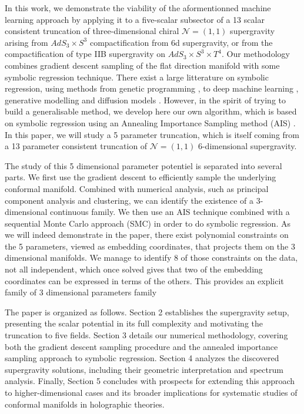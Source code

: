 \documentclass[11pt]{article}
\begin{document}
In this work, we demonstrate the viability of the aformentionned machine learning approach by applying it to a five-scalar subsector of a 13 scalar consistent truncation of three-dimensional chiral $\mathcal{N} = (1,1)$  supergravity arising from $AdS_3 \times S^3$ compactification from 6d supergravity, or from the compactification of type IIB supergravity on $AdS_3 \times S^3 \times T^4$. Our methodology combines gradient descent sampling of the flat direction manifold with some symbolic regression technique. There exist a large litterature on symbolic regression, using methods from genetic programming \cite{koza1994genetic,randall2022bingo,burlacu2019parsimony}, to deep machine learning \cite{petersen2019deep,kamienny2022end}, generative modelling \cite{valipour2021symbolicgpt} and diffusion models \cite{bastiani2025diffusion}. However, in the spirit of trying to build a generalisable method, we develop here our own algorithm, which is based on symbolic regression using an Annealing Importance Sampling method (AIS) \cite{neal1998annealedimportancesampling}. In this paper, we will study a 5 parameter truncation, which is itself coming from a 13 parameter consistent truncation of $\mathcal{N} = (1,1)$ 6-dimensional supergravity. 

The study of this 5 dimensional parameter potentiel is separated into several parts. We first use the gradient descent to efficiently sample the underlying conformal manifold. Combined with numerical analysis, such as principal component analysis and clustering, we can identify the existence of a 3-dimensional continuous family. We then use an AIS technique combined with a sequential Monte Carlo approach (SMC) \cite{del2006sequential} in order to do symbolic regression. As we will indeed demonstrate in the paper, there exist polynomial constraints on the 5 parameters, viewed as embedding coordinates, that projects them on the 3 dimensional manifolds. We manage to identify 8 of those constraints on the data, not all independent, which once solved gives that two of the embedding coordinates can be expressed in terms of the others. This provides an explicit family of 3 dimensional parameters family 

The paper is organized as follows. Section 2 establishes the supergravity setup, presenting the scalar potential in its full complexity and motivating the truncation to five fields. Section 3 details our numerical methodology, covering both the gradient descent sampling procedure and the annealed importance sampling approach to symbolic regression. Section 4 analyzes the discovered supergravity solutions, including their geometric interpretation and spectrum analysis. Finally, Section 5 concludes with prospects for extending this approach to higher-dimensional cases and its broader implications for systematic studies of conformal manifolds in holographic theories.
\end{document}
